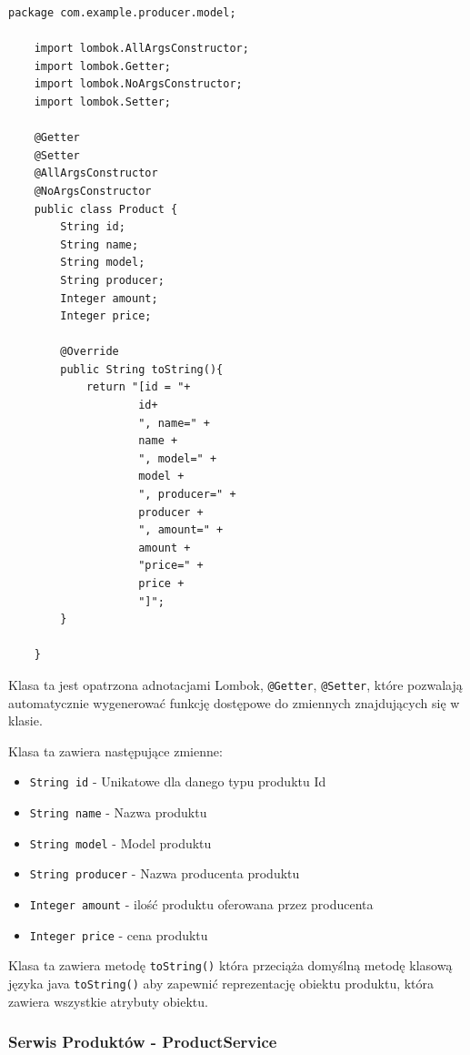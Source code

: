 \begin{lstlisting}[caption=Klasa reprezentująca produkt, label=produktmodel]
    package com.example.producer.model;
    
    import lombok.AllArgsConstructor;
    import lombok.Getter;
    import lombok.NoArgsConstructor;
    import lombok.Setter;
    
    @Getter
    @Setter
    @AllArgsConstructor
    @NoArgsConstructor
    public class Product {
        String id;
        String name;
        String model;
        String producer;
        Integer amount;
        Integer price;
    
        @Override
        public String toString(){
            return "[id = "+
                    id+
                    ", name=" +
                    name +
                    ", model=" +
                    model +
                    ", producer=" +
                    producer +
                    ", amount=" +
                    amount +
                    "price=" +
                    price +
                    "]";
        }
    
    }
\end{lstlisting}

Klasa ta jest opatrzona adnotacjami Lombok, \verb|@Getter|, \verb|@Setter|, które pozwalają automatycznie wygenerować funkcję dostępowe do zmiennych znajdujących się w klasie.

Klasa ta zawiera następujące zmienne:
\begin{itemize}
    \item \verb|String id| - Unikatowe dla danego typu produktu Id
    \item \verb|String name| - Nazwa produktu
    \item \verb|String model| - Model produktu
    \item \verb|String producer| - Nazwa producenta produktu
    \item \verb|Integer amount| - ilość produktu oferowana przez producenta
    \item \verb|Integer price| - cena produktu
\end{itemize}

Klasa ta zawiera metodę \verb|toString()| która przeciąża domyślną metodę klasową języka java \verb|toString()| aby zapewnić reprezentację obiektu produktu, która zawiera wszystkie atrybuty obiektu.

\subsubsection{Serwis Produktów - ProductService}

